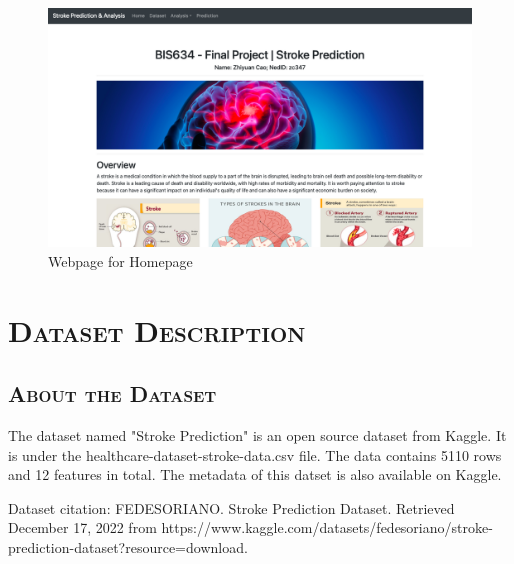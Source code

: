 \documentclass[a4paper,12pt]{article}
\begin{document}
\begin{figure}[h] 
    \centering
    \includegraphics[width=1\textwidth]{home_p1} 
    \caption{Webpage for Homepage} 
\end{figure}


\section{\textsc{Dataset Description}}
\subsection{\textsc{About the Dataset}}
The dataset named "Stroke Prediction" is an open source dataset from Kaggle. It is under the healthcare-dataset-stroke-data.csv file. The data contains 5110 rows and 12 features in total. The metadata of this datset is also available on Kaggle.

Dataset citation: FEDESORIANO. Stroke Prediction Dataset. Retrieved December 17, 2022 from https://www.kaggle.com/datasets/fedesoriano/stroke-prediction-dataset?resource=download.
\end{document}
